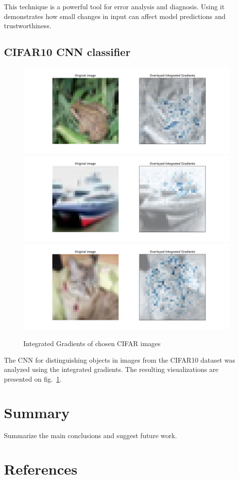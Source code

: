 \documentclass[journal, a4paper]{IEEEtran}
\begin{document}
This technique is a powerful tool for error analysis and diagnosis.
Using it demonstrates how small changes in input can affect model predictions and trustworthiness.

\subsection{CIFAR10 CNN classifier}\label{subsec:experiment-cifar}

\begin{figure}[ht]\centering
    \includegraphics[width=.6\linewidth]{img/integrated_grad/cifar_CNN/frog}
    \includegraphics[width=.6\linewidth]{img/integrated_grad/cifar_CNN/ship}
    \includegraphics[width=.6\linewidth]{img/integrated_grad/cifar_CNN/cat2}
    \caption{Integrated Gradients of chosen CIFAR images}\label{fig:cifar-cnn-int-grad}
\end{figure}

The CNN for distinguishing objects in images from the CIFAR10 dataset was analyzed using the integrated gradients.
The resulting visualizations are presented on fig.~\ref{fig:cifar-cnn-int-grad}.


\section{Summary}\label{sec:summary}
Summarize the main conclusions and suggest future work.

\section{References}\label{sec:references}



\end{document}
